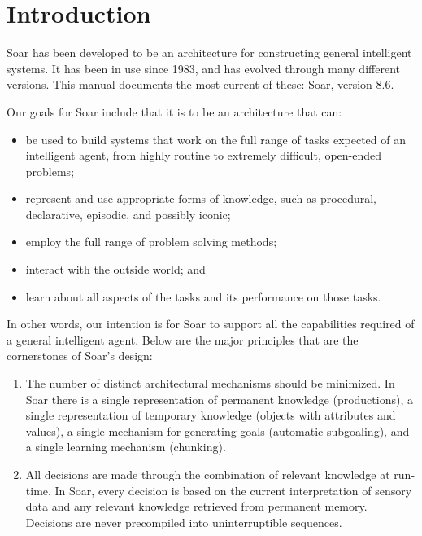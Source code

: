 \chapter{Introduction}
\label{INTRO}

Soar has been developed to be an architecture for constructing general
intelligent systems. It has been in use since 1983, and has evolved through
many different versions. This manual documents the most current of these:
Soar, version 8.6.

Our goals for Soar include that it is to be an architecture that can: \vspace{-12pt}

\begin{itemize} 
\item be used to build systems that work on the full range of tasks expected
	of an \linebreak intelligent agent, from highly routine to extremely difficult,
	open-ended problems;\vspace{-6pt}
\item represent and use appropriate forms of knowledge, such as procedural,
	declarative, episodic, and possibly iconic;\vspace{-6pt}
\item employ the full range of problem solving methods;\vspace{-6pt}
\item interact with the outside world; and\vspace{-6pt}
\item learn about all aspects of the tasks and its performance on those tasks.
\end{itemize} 

In other words, our intention is for Soar to support all the capabilities
required of a general intelligent agent. Below are the major principles that
are the cornerstones of Soar's design:  \vspace{-12pt}

\begin{enumerate} 
\item The number of distinct architectural mechanisms should be minimized.
        In Soar there is a single representation of permanent knowledge
        (productions), a single representation of temporary knowledge (objects
        with attributes and values), a single mechanism for generating goals
        (automatic subgoaling), and a single learning mechanism (chunking).\vspace{-6pt}

\item All decisions are made through the combination of relevant knowledge at
        run-time.  In Soar, every decision is based on the current
        interpretation of sensory data and any relevant knowledge retrieved
        from permanent memory.  Decisions are never precompiled into
        uninterruptible sequences.
\end{enumerate}


